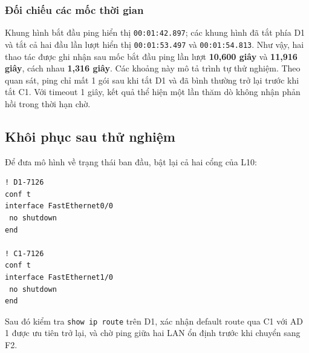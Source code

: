 \subsubsection{Đối chiếu các mốc thời gian}

Khung hình bắt đầu ping hiển thị \texttt{00:01:42.897};
các khung hình đã tắt phía D1 và tắt cả hai đầu
lần lượt hiển thị \texttt{00:01:53.497}
và \texttt{00:01:54.813}.
Như vậy, hai thao tác được ghi nhận sau mốc bắt đầu ping
lần lượt \textbf{10,600 giây} và \textbf{11,916 giây},
cách nhau \textbf{1,316 giây}.
Các khoảng này mô tả trình tự thử nghiệm.
Theo quan sát, ping chỉ mất 1 gói sau khi tắt D1
và đã bình thường trở lại trước khi tắt C1.
Với timeout 1 giây, kết quả thể hiện một lần thăm dò
không nhận phản hồi trong thời hạn chờ.

\subsection{Khôi phục sau thử nghiệm}

Để đưa mô hình về trạng thái ban đầu,
bật lại cả hai cổng của L10:

\begin{lstlisting}
! D1-7126
conf t
interface FastEthernet0/0
 no shutdown
end

! C1-7126
conf t
interface FastEthernet1/0
 no shutdown
end
\end{lstlisting}

Sau đó kiểm tra \texttt{show ip route} trên D1,
xác nhận default route qua C1 với AD 1 được ưu tiên trở lại,
và chờ ping giữa hai LAN ổn định trước khi chuyển sang F2.

\newpage
